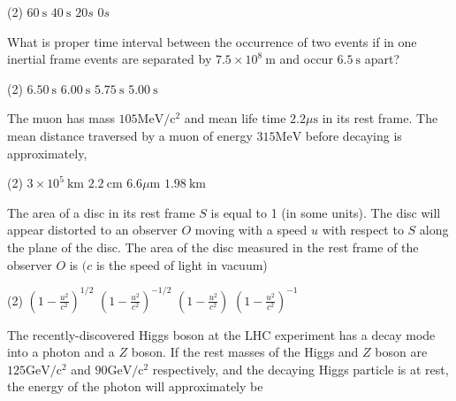 \begin{enumerate}
\begin{tasks}(2)
	\task[\textbf{A.}] $60 \mathrm{~s}$
	\task[\textbf{B.}]$40 \mathrm{~s}$
	\task[\textbf{C.}]$20 s$
	\task[\textbf{D.}] $0 s$
\end{tasks}
\begin{minipage}{\textwidth}
	\item What is proper time interval between the occurrence of two events if in one inertial frame events are separated by $7.5 \times 10^{8} \mathrm{~m}$ and occur $6.5 \mathrm{~s}$ apart?
\end{minipage}
\begin{tasks}(2)
	\task[\textbf{A.}] $6.50 \mathrm{~s}$
	\task[\textbf{B.}]$6.00 \mathrm{~s}$
	\task[\textbf{C.}]$5.75 \mathrm{~s}$
	\task[\textbf{D.}]$5.00 \mathrm{~s}$
\end{tasks}
\begin{minipage}{\textwidth}
	\item The muon has mass $105 \mathrm{MeV} / \mathrm{c}^{2}$ and mean life time $2.2 \mu \mathrm{s}$ in its rest frame. The mean distance traversed by a muon of energy $315 \mathrm{MeV}$ before decaying is approximately,
\end{minipage}
\begin{tasks}(2)
	\task[\textbf{A.}] $3 \times 10^{5} \mathrm{~km}$ 
	\task[\textbf{B.}]$2.2 \mathrm{~cm}$
	\task[\textbf{C.}]$6.6 \mu \mathrm{m}$
	\task[\textbf{D.}]$1.98 \mathrm{~km}$
\end{tasks}
\begin{minipage}{\textwidth}
	\item The area of a disc in its rest frame $S$ is equal to 1 (in some units). The disc will appear distorted to an observer $O$ moving with a speed $u$ with respect to $S$ along the plane of the disc. The area of the disc measured in the rest frame of the observer $O$ is $(c$ is the speed of light in vacuum)
\end{minipage}
\begin{tasks}(2)
	\task[\textbf{A.}] $\left(1-\frac{u^{2}}{c^{2}}\right)^{1 / 2}$
	\task[\textbf{B.}]$\left(1-\frac{u^{2}}{c^{2}}\right)^{-1 / 2}$
	\task[\textbf{C.}]$\left(1-\frac{u^{2}}{c^{2}}\right)$
	\task[\textbf{D.}]$\left(1-\frac{u^{2}}{c^{2}}\right)^{-1}$
\end{tasks}
\begin{minipage}{\textwidth}
	\item The recently-discovered Higgs boson at the LHC experiment has a decay mode into a photon and a $Z$ boson. If the rest masses of the Higgs and $Z$ boson are $125 \mathrm{GeV} / \mathrm{c}^{2}$ and $90 \mathrm{GeV} / \mathrm{c}^{2}$ respectively, and the decaying Higgs particle is at rest, the energy of the photon will approximately be

\end{minipage}
\end{enumerate}
